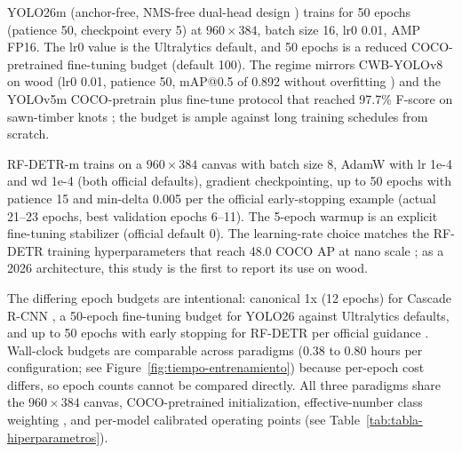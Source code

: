 \documentclass[pdflatex,sn-basic,Numbered,iicol]{sn-jnl}
\begin{document}
YOLO26m (anchor-free, NMS-free dual-head design \citep{wang2024yolov10}) trains for 50 epochs (patience 50, checkpoint every 5) at $960\times 384$, batch size 16, lr0 0.01, AMP FP16. The lr0 value is the Ultralytics default, and 50 epochs is a reduced COCO-pretrained fine-tuning budget (default 100). The regime mirrors CWB-YOLOv8 on wood (lr0 0.01, patience 50, mAP@0.5 of 0.892 without overfitting \citep{cwbyolo2024}) and the YOLOv5m COCO-pretrain plus fine-tune protocol that reached 97.7\% F-score on sawn-timber knots \citep{fang2021yolov5knots}; the budget is ample against long training schedules from scratch.

RF-DETR-m \citep{robinson2026rfdetrneuralarchitecturesearch} trains on a $960\times 384$ canvas with batch size 8, AdamW with lr 1e-4 and wd 1e-4 (both official defaults), gradient checkpointing, up to 50 epochs with patience 15 and min-delta 0.005 per the official early-stopping example (actual 21--23 epochs, best validation epochs 6--11). The 5-epoch warmup is an explicit fine-tuning stabilizer (official default 0). The learning-rate choice matches the RF-DETR training hyperparameters that reach 48.0 COCO AP at nano scale \citep{robinson2026rfdetrneuralarchitecturesearch}; as a 2026 architecture, this study is the first to report its use on wood.

The differing epoch budgets are intentional: canonical 1x (12 epochs) for Cascade R-CNN \citep{he2019rethinking}, a 50-epoch fine-tuning budget for YOLO26 against Ultralytics defaults, and up to 50 epochs with early stopping for RF-DETR per official guidance \citep{robinson2026rfdetrneuralarchitecturesearch}. Wall-clock budgets are comparable across paradigms (0.38 to 0.80 hours per configuration; see Figure~\ref{fig:tiempo-entrenamiento}) because per-epoch cost differs, so epoch counts cannot be compared directly. All three paradigms share the $960\times 384$ canvas, COCO-pretrained initialization, effective-number class weighting \citep{cui2019classbalanced}, and per-model calibrated operating points (see Table~\ref{tab:tabla-hiperparametros}).
\end{document}
